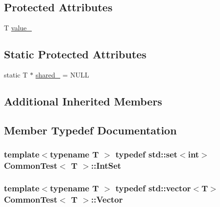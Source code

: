 \subsection*{Protected Attributes}
\begin{DoxyCompactItemize}
\item 
T \hyperlink{class_common_test_ae59c4abcb833625a7baeb2048531ebec}{value\-\_\-}
\end{DoxyCompactItemize}
\subsection*{Static Protected Attributes}
\begin{DoxyCompactItemize}
\item 
static T $\ast$ \hyperlink{class_common_test_a52368ce1e65a865db9bdccbcc2cedaac}{shared\-\_\-} = N\-U\-L\-L
\end{DoxyCompactItemize}
\subsection*{Additional Inherited Members}


\subsection{Member Typedef Documentation}
\hypertarget{class_common_test_a62827e9d3064cddf4a8698747f1bd434}{
\subsubsection[{Int\-Set}]{\setlength{\rightskip}{0pt plus 5cm}template$<$typename T $>$ typedef std\-::set$<$int$>$ {\bf Common\-Test}$<$ T $>$\-::{\bf Int\-Set}\hspace{0.3cm}{\ttfamily [protected]}}}\label{class_common_test_a62827e9d3064cddf4a8698747f1bd434}
\hypertarget{class_common_test_a6dfdcede6964887b9f4254a0e0478e37}{
\subsubsection[{Vector}]{\setlength{\rightskip}{0pt plus 5cm}template$<$typename T $>$ typedef std\-::vector$<$T$>$ {\bf Common\-Test}$<$ T $>$\-::{\bf Vector}\hspace{0.3cm}{\ttfamily [protected]}}}\label{class_common_test_a6dfdcede6964887b9f4254a0e0478e37}


